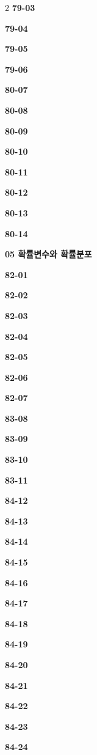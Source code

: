 \documentclass[10pt,a4paper]{article}
\begin{document}
\begin{multicols}{2}
\noindent\textbf{79-03}\ \par
\noindent\textbf{79-04}\ \par
\noindent\textbf{79-05}\ \par
\noindent\textbf{79-06}\ \par
\noindent\textbf{80-07}\ \par
\noindent\textbf{80-08}\ \par
\noindent\textbf{80-09}\ \par
\noindent\textbf{80-10}\ \par
\noindent\textbf{80-11}\ \par
\noindent\textbf{80-12}\ \par
\noindent\textbf{80-13}\ \par
\noindent\textbf{80-14}\ \par
\noindent\textbf{05 확률변수와 확률분포}\par\smallskip
\noindent\textbf{82-01}\ \par
\noindent\textbf{82-02}\ \par
\noindent\textbf{82-03}\ \par
\noindent\textbf{82-04}\ \par
\noindent\textbf{82-05}\ \par
\noindent\textbf{82-06}\ \par
\noindent\textbf{82-07}\ \par
\noindent\textbf{83-08}\ \par
\noindent\textbf{83-09}\ \par
\noindent\textbf{83-10}\ \par
\noindent\textbf{83-11}\ \par
\noindent\textbf{84-12}\ \par
\noindent\textbf{84-13}\ \par
\noindent\textbf{84-14}\ \par
\noindent\textbf{84-15}\ \par
\noindent\textbf{84-16}\ \par
\noindent\textbf{84-17}\ \par
\noindent\textbf{84-18}\ \par
\noindent\textbf{84-19}\ \par
\noindent\textbf{84-20}\ \par
\noindent\textbf{84-21}\ \par
\noindent\textbf{84-22}\ \par
\noindent\textbf{84-23}\ \par
\noindent\textbf{84-24}\ \par

\end{multicols}
\end{document}
